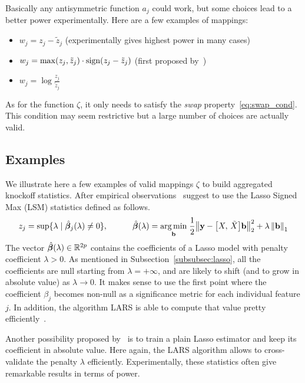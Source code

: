 Basically any antisymmetric function $a_j$ could work, but some choices lead to a better power experimentally.
Here are a few examples of mappings:
\begin{itemize}
    \item $w_j = z_j - \tilde{z}_j$ (experimentally gives highest power in many cases)
    \item $w_j = \max(z_j, \tilde{z}_j) \cdot \operatorname*{sign}(z_j - \tilde{z}_j)$ (first proposed by~\cite{fixed_x_knockoffs})
    \item $w_j = \log\frac{z_j}{\tilde{z}_j}$
\end{itemize}
As for the function $\zeta$, it only needs to satisfy the \emph{swap} property~\ref{eq:swap_cond}.
This condition may seem restrictive but a large number of choices are actually valid.

\subsection{Examples}\label{subsec:sce}

We illustrate here a few examples of valid mappings $\zeta$
to build aggregated knockoff statistics.
After empirical observations~\cite{fixed_x_knockoffs}
suggest to use the Lasso Signed Max (LSM) statistics defined as follows.
\begin{equation}
    z_j = \sup\{\lambda \mid \hat{\bm{\beta}}_j(\lambda) \neq 0\}
    ,\qquad\quad
    \hat{\bm{\beta}}(\lambda) =
    \underset{\mathbf{b}}{\operatorname*{arg\,min}}\;
    \frac{1}{2}\big\lVert \mathbf{y} - \big[ X,\, \tilde{X} \big]\mathbf{b} \big\rVert_2^2 + \lambda\left\lVert\mathbf{b}\right\rVert_1
\end{equation}
The vector $\hat{\bm{\beta}}(\lambda) \in \mathbb{R}^{2p}$ contains the coefficients of a Lasso model
with penalty coefficient $\lambda > 0$.
As mentioned in Subsection~\ref{subsubsec:lasso},
all the coefficients are null starting from $\lambda = +\infty$,
and are likely to shift (and to grow in absolute value) as $\lambda \to 0$.
It makes sense to use the first point where the coefficient $\beta_j$ becomes non-null
as a significance metric for each individual feature $j$.
In addition, the algorithm LARS is able to compute that value pretty efficiently~\citep{lars_complexity}.

Another possibility proposed by~\cite{model_x_knockoffs} is to train a plain Lasso estimator
and keep its coefficient in absolute value.
Here again, the LARS algorithm allows to cross-validate the penalty $\lambda$ efficiently.
Experimentally, these statistics often give remarkable results in terms of power.

